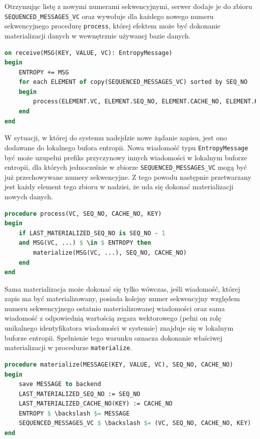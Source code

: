Otrzymując listę z nowymi numerami sekwencyjnymi, serwer dodaje je do zbioru \texttt{SEQUENCED\_MESSAGES\_VC} oraz wywołuje dla każdego nowego numeru sekwencyjnego procedurę \texttt{process}, której efektem może być dokonanie materializacji danych w wewnętrznie używanej bazie danych.

\begin{lstlisting}[language=Pascal, caption=Pseudokod procedury obsługi wiadomości informującej o nowym zapisie w systemie, mathescape=true]
on receive(MSG(KEY, VALUE, VC): EntropyMessage)
begin
    ENTROPY += MSG
    for each ELEMENT of copy(SEQUENCED_MESSAGES_VC) sorted by SEQ_NO
    begin
        process(ELEMENT.VC, ELEMENT.SEQ_NO, ELEMENT.CACHE_NO, ELEMENT.KEY)
    end
end
\end{lstlisting}

W sytuacji, w której do systemu nadejdzie nowe żądanie zapisu, jest ono dodawane do lokalnego bufora entropii. Nowa wiadomość typu \texttt{EntropyMessage} być może uzupełni prefiks przyczynowy innych wiadomości w lokalnym buforze entropii, dla których jednocześnie w zbiorze \texttt{SEQUENCED\_MESSAGES\_VC} mogą być już przechowywane numery sekwencyjne. Z tego powodu następnie przetwarzany jest każdy element tego zbioru w nadziei, że uda się dokonać materializacji nowych danych.

\begin{lstlisting}[language=Pascal, caption=Pseudokod procedury próbującej dokonać materializacji o ile jest to możliwe, mathescape=true]
procedure process(VC, SEQ_NO, CACHE_NO, KEY)
begin
    if LAST_MATERIALIZED_SEQ_NO is SEQ_NO - 1
    and MSG(VC, ...) $ \in $ ENTROPY then
        materialize(MSG(VC, ...), SEQ_NO, CACHE_NO)
    end
end
\end{lstlisting}

Sama materializacja może dokonać się tylko wówczas, jeśli wiadomość, której zapis ma być materializowany, posiada kolejny numer sekwencyjny względem numeru sekwencyjnego ostatnio materializowanej wiadomości oraz sama wiadomość z odpowiednią wartością zegara wektorowego (pełni on rolę unikalnego identyfikatora wiadomości w systemie) znajduje się w lokalnym buforze entropii. Spełnienie tego warunku oznacza dokonanie właściwej materializacji w procedurze \texttt{materialize}.

\begin{lstlisting}[language=Pascal, caption=Pseudokod procedury materializacji wartości na danym węźle, mathescape=true]
procedure materialize(MESSAGE(KEY, VALUE, VC), SEQ_NO, CACHE_NO)
begin
    save MESSAGE to backend
    LAST_MATERIALIZED_SEQ_NO := SEQ_NO
    LAST_MATERIALIZED_CACHE_NO(KEY) := CACHE_NO
    ENTROPY $ \backslash $= MESSAGE
    SEQUENCED_MESSAGES_VC $ \backslash $= (VC, SEQ_NO, CACHE_NO, KEY)
end
\end{lstlisting}

